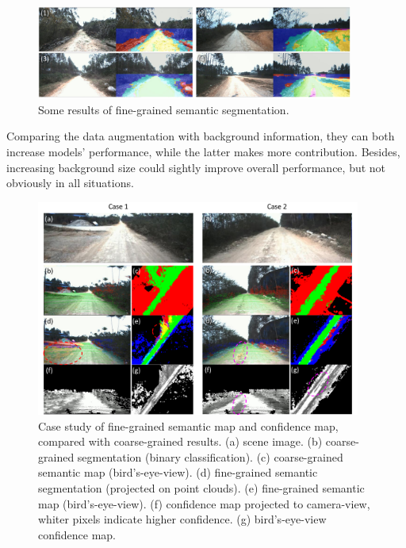\documentclass[letterpaper, 10 pt, conference]{ieeeconf}  %
\begin{document}
\begin{figure}[]
	\centering
	\includegraphics[width=0.93\textwidth]{semantic_segmentation.pdf}
	\caption{Some results of fine-grained semantic segmentation.}
	\label{fig:semantic_segmentation}
\end{figure}

Comparing the data augmentation with background information, they can both increase models' performance, while the latter makes more contribution. Besides, increasing background size could sightly improve overall performance, but not obviously in all situations.

\begin{figure}[]
	\centering
	\includegraphics[width=0.95\textwidth]{semantic_mapping.pdf}
	\caption{Case study of fine-grained semantic map and confidence map, compared with coarse-grained  results. (a) scene image. (b) coarse-grained segmentation (binary classification). (c) coarse-grained semantic map (bird's-eye-view). (d) fine-grained semantic segmentation (projected on point clouds). (e) fine-grained semantic map (bird's-eye-view). (f) confidence map projected to camera-view, whiter pixels indicate higher confidence. (g) bird's-eye-view confidence map.}
	\label{fig:semantic_mapping}
	\vspace{-4mm}
\end{figure}
\end{document}
